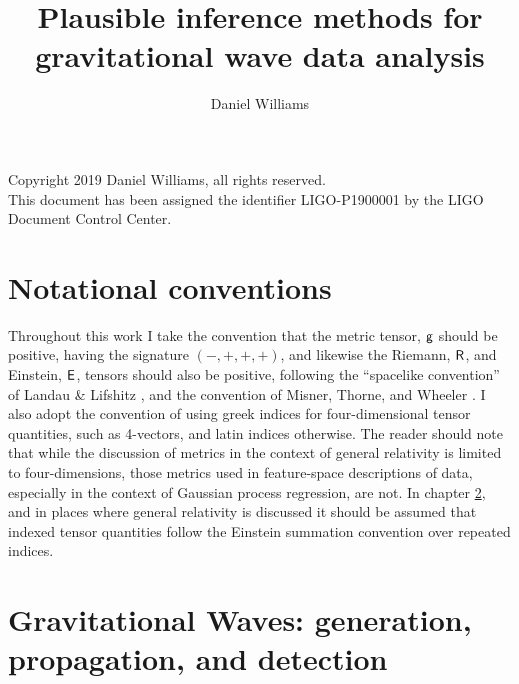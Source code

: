 \documentclass[oneside, oldfontcommands]{kentigern}
\title{Plausible inference methods for gravitational wave data analysis}
\author{Daniel Williams}
\theoremstyle{definition}
\begin{document}
\openright
\frontmatter
\thesistitle
\newpage \newpage

\begin{abstract}

\end{abstract}
\newpage

Copyright 2019 Daniel Williams, all rights reserved.\\

This document has been assigned the identifier LIGO-P1900001 by the LIGO Document Control Center.
\newpage

%



\newpage
\tableofcontents
\newpage
\listoffigures
\newpage
\listoftables
\newpage

\printglossary[type=\acronymtype]



\newpage
\chapter{Notational conventions}
\label{sec:notation-conventions}

Throughout this work I take the convention that the metric tensor, $\mathsf{g}$ should be positive, having the signature $(-,+,+,+)$, and likewise the Riemann, $\mathsf{R}$, and Einstein, $\mathsf{E}$, tensors should also be positive, following the ``spacelike convention'' of Landau \& Lifshitz \cite{1975ctf..book.....L}, and the convention of Misner, Thorne, and Wheeler \cite{mtw}. I also adopt the convention of using greek indices for four-dimensional tensor quantities, such as 4-vectors, and latin indices otherwise. The reader should note that while the discussion of metrics in the context of general relativity is limited to four-dimensions, those metrics used in feature-space descriptions of data, especially in the context of Gaussian process regression, are not.
In chapter \ref{cha:intro}, and in places where general relativity is discussed it should be assumed that indexed tensor quantities follow the Einstein summation convention over repeated indices.

\mainmatter
\glsresetall
\chapter[Gravitational Waves: Generation, propagation, and detection]{Gravitational Waves: generation, propagation, and detection}
\label{cha:intro}
\end{document}
